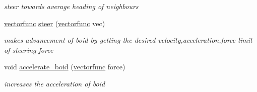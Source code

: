 \begin{DoxyCompactItemize}
\begin{DoxyCompactList}\small\item\em steer towards average heading of neighbours \end{DoxyCompactList}\item 
\mbox{\label{classboidrules_a9a72560c1d316a5e2191fd2a1d258499}} 
\mbox{\hyperlink{classvectorfunc}{vectorfunc}} \mbox{\hyperlink{classboidrules_a9a72560c1d316a5e2191fd2a1d258499}{steer}} (\mbox{\hyperlink{classvectorfunc}{vectorfunc}} vec)
\begin{DoxyCompactList}\small\item\em makes advancement of boid by getting the desired velocity,acceleration,force limit of steering force \end{DoxyCompactList}\item 
\mbox{\label{classboidrules_a638a0fb28463f690dfc1e634ec1d8b01}} 
void \mbox{\hyperlink{classboidrules_a638a0fb28463f690dfc1e634ec1d8b01}{accelerate\+\_\+boid}} (\mbox{\hyperlink{classvectorfunc}{vectorfunc}} force)
\begin{DoxyCompactList}\small\item\em increases the acceleration of boid \end{DoxyCompactList}\end{DoxyCompactItemize}
